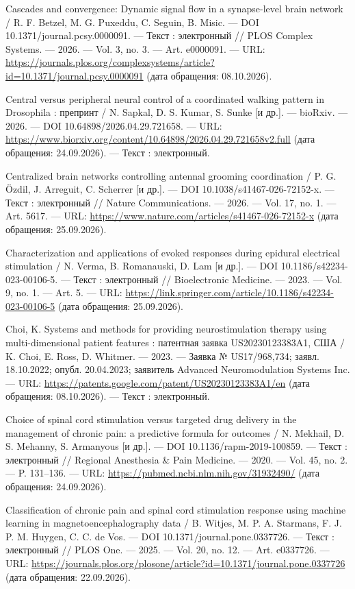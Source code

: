 \begin{list}{}{\setlength{\leftmargin}{10mm}\setlength{\labelwidth}{8mm}\setlength{\labelsep}{2mm}\setlength{\itemsep}{0pt}\setlength{\parsep}{0pt}\setlength{\topsep}{0pt}}
\item[49.] Cascades and convergence: Dynamic signal flow in a synapse-level brain network / R. F. Betzel, M. G. Puxeddu, C. Seguin, B. Misic. — DOI 10.1371/journal.pcsy.0000091. — Текст : электронный // PLOS Complex Systems. — 2026. — Vol. 3, no. 3. — Art. e0000091. — URL: \url{https://journals.plos.org/complexsystems/article?id=10.1371/journal.pcsy.0000091} (дата обращения: 08.10.2026).
\item[50.] Central versus peripheral neural control of a coordinated walking pattern in Drosophila : препринт / N. Sapkal, D. S. Kumar, S. Sunke [и др.]. — bioRxiv. — 2026. — DOI 10.64898/2026.04.29.721658. — URL: \url{https://www.biorxiv.org/content/10.64898/2026.04.29.721658v2.full} (дата обращения: 24.09.2026). — Текст : электронный.
\item[51.] Centralized brain networks controlling antennal grooming coordination / P. G. Özdil, J. Arreguit, C. Scherrer [и др.]. — DOI 10.1038/s41467-026-72152-x. — Текст : электронный // Nature Communications. — 2026. — Vol. 17, no. 1. — Art. 5617. — URL: \url{https://www.nature.com/articles/s41467-026-72152-x} (дата обращения: 25.09.2026).
\item[52.] Characterization and applications of evoked responses during epidural electrical stimulation / N. Verma, B. Romanauski, D. Lam [и др.]. — DOI 10.1186/s42234-023-00106-5. — Текст : электронный // Bioelectronic Medicine. — 2023. — Vol. 9, no. 1. — Art. 5. — URL: \url{https://link.springer.com/article/10.1186/s42234-023-00106-5} (дата обращения: 25.09.2026).
\item[53.] Choi, K. Systems and methods for providing neurostimulation therapy using multi-dimensional patient features : патентная заявка US20230123383A1, США / K. Choi, E. Ross, D. Whitmer. — 2023. — Заявка № US17/968,734; заявл. 18.10.2022; опубл. 20.04.2023; заявитель Advanced Neuromodulation Systems Inc. — URL: \url{https://patents.google.com/patent/US20230123383A1/en} (дата обращения: 08.10.2026). — Текст : электронный.
\item[54.] Choice of spinal cord stimulation versus targeted drug delivery in the management of chronic pain: a predictive formula for outcomes / N. Mekhail, D. S. Mehanny, S. Armanyous [и др.]. — DOI 10.1136/rapm-2019-100859. — Текст : электронный // Regional Anesthesia \& Pain Medicine. — 2020. — Vol. 45, no. 2. — P. 131–136. — URL: \url{https://pubmed.ncbi.nlm.nih.gov/31932490/} (дата обращения: 24.09.2026).
\item[55.] Classification of chronic pain and spinal cord stimulation response using machine learning in magnetoencephalography data / B. Witjes, M. P. A. Starmans, F. J. P. M. Huygen, C. C. de Vos. — DOI 10.1371/journal.pone.0337726. — Текст : электронный // PLOS One. — 2025. — Vol. 20, no. 12. — Art. e0337726. — URL: \url{https://journals.plos.org/plosone/article?id=10.1371/journal.pone.0337726} (дата обращения: 22.09.2026).

\end{list}
